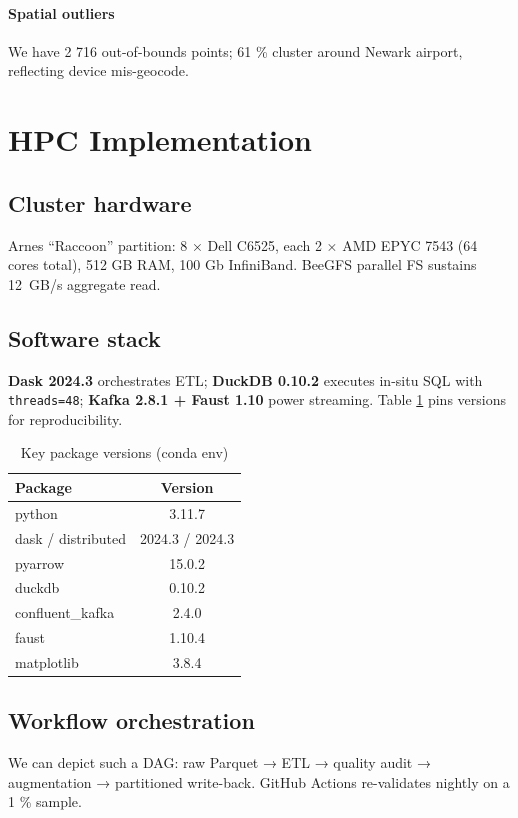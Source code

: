 \documentclass[conference]{IEEEtran}
\begin{document}
\paragraph*{Spatial outliers}
We have 2 716 out-of-bounds
points; 61 \% cluster around Newark
airport, reflecting device mis-geocode.


\section{HPC Implementation}\label{sec:method}
\subsection{Cluster hardware}
Arnes “Raccoon” partition: 8 × Dell C6525, each
2 × AMD EPYC 7543 (64 cores total), 512 GB RAM, 100 Gb InfiniBand.
BeeGFS parallel FS sustains \SI{12}{GB/s} aggregate read.

\subsection{Software stack}
\textbf{Dask 2024.3} orchestrates ETL;  
\textbf{DuckDB 0.10.2} executes in-situ SQL with \verb|threads=48|;  
\textbf{Kafka 2.8.1 + Faust 1.10} power streaming.  
Table \ref{tab:versions} pins versions for reproducibility.

\begin{table}[htbp]
\caption{Key package versions (conda env)}
\label{tab:versions}
\centering
\begin{tabular}{lc}
\toprule
Package & Version \\ \midrule
python & 3.11.7\\
dask / distributed & 2024.3 / 2024.3\\
pyarrow & 15.0.2\\
duckdb & 0.10.2\\
confluent\_kafka & 2.4.0\\
faust & 1.10.4\\
matplotlib & 3.8.4\\
\bottomrule
\end{tabular}
\end{table}

\subsection{Workflow orchestration}
We can depict such a DAG: raw Parquet → ETL → quality audit →
augmentation → partitioned write-back.
GitHub Actions re-validates nightly on a 1 \% sample.
\end{document}
